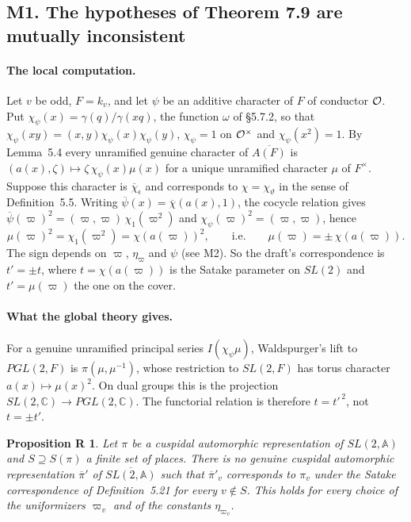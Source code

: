 \documentclass[12pt,letterpaper]{article}
\newcommand{\A}{\mathbb{A}}
\newcommand{\C}{\mathbb{C}}
\newcommand{\ov}[1]{\overline{#1}}
\theoremstyle{plain}
\newtheorem*{propR}{Proposition R}
\begin{document}
\subsection*{M1. The hypotheses of Theorem 7.9 are mutually inconsistent}

\paragraph{The local computation.} Let $v$ be odd, $F=k_v$, and let
$\psi$ be an additive character of $F$ of conductor ${\cal O}$. Put
$\chi_\psi(x)=\gamma(q)/\gamma(xq)$, the function $\omega$ of \S5.7.2, so
that $\chi_\psi(xy)=(x,y)\chi_\psi(x)\chi_\psi(y)$, $\chi_\psi=1$ on
${\cal O}^\times$ and $\chi_\psi(x^2)=1$. By Lemma~5.4 every unramified
genuine character of $\ov{A(F)}$ is
$(a(x),\zeta)\mapsto\zeta\,\chi_\psi(x)\mu(x)$ for a unique unramified
character $\mu$ of $F^\times$. Suppose this character is
$\ov\chi_\epsilon$ and corresponds to $\chi=\chi_\vartheta$ in the sense of
Definition~5.5. Writing $\ov\psi(x)=\ov\chi(a(x),1)$, the cocycle relation
gives $\ov\psi(\varpi)^2=(\varpi,\varpi)\,\chi_1(\varpi^2)$ and
$\chi_\psi(\varpi)^2=(\varpi,\varpi)$, hence
\begin{equation}\label{eq:square}
\mu(\varpi)^2=\chi_1(\varpi^2)=\chi(a(\varpi))^2,
\qquad\text{i.e.}\qquad \mu(\varpi)=\pm\,\chi(a(\varpi)).
\end{equation}
The sign depends on $\varpi$, $\eta_\varpi$ and $\psi$ (see M2). So the
draft's correspondence is $t'=\pm t$, where $t=\chi(a(\varpi))$ is the
Satake parameter on $SL(2)$ and $t'=\mu(\varpi)$ the one on the cover.

\paragraph{What the global theory gives.} For a genuine unramified
principal series $I(\chi_\psi\mu)$, Waldspurger's lift to $PGL(2,F)$ is
$\pi(\mu,\mu^{-1})$, whose restriction to $SL(2,F)$ has torus character
$a(x)\mapsto\mu(x)^2$. On dual groups this is the projection
$SL(2,\C)\to PGL(2,\C)$. The functorial relation is therefore
$t=t'^{\,2}$, not $t=\pm t'$.

\begin{propR}
Let $\pi$ be a cuspidal automorphic representation of $SL(2,\A)$ and
$S\supseteq S(\pi)$ a finite set of places. There is no genuine cuspidal
automorphic representation $\ov\pi'$ of $\ov{SL(2,\A)}$ such that
$\ov\pi'_v$ corresponds to $\pi_v$ under the Satake correspondence of
Definition~5.21 for every $v\notin S$. This holds for every choice of the
uniformizers $\varpi_v$ and of the constants $\eta_{\varpi_v}$.
\end{propR}
\end{document}

